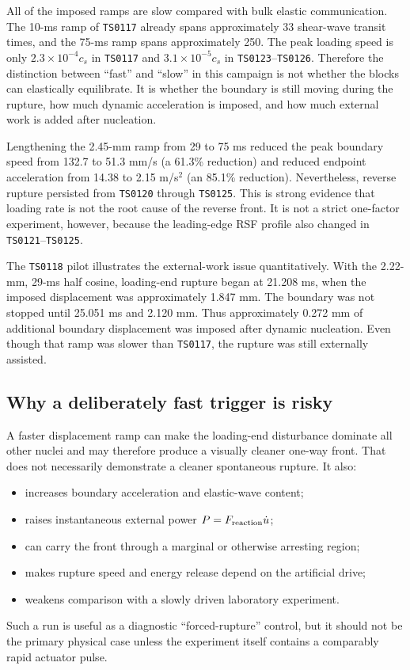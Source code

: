 \documentclass[11pt]{article}
\newcommand{\run}[1]{\texttt{TS#1}}
\begin{document}
All of the imposed ramps are slow compared with bulk elastic communication.
The 10-ms ramp of \run{0117} already spans approximately 33 shear-wave transit
times, and the 75-ms ramp spans approximately 250.  The peak loading speed is
only $2.3\times10^{-4}c_s$ in \run{0117} and
$3.1\times10^{-5}c_s$ in \run{0123}--\run{0126}.  Therefore the distinction
between ``fast'' and ``slow'' in this campaign is not whether the blocks can
elastically equilibrate.  It is whether the boundary is still moving during
the rupture, how much dynamic acceleration is imposed, and how much external
work is added after nucleation.

Lengthening the 2.45-mm ramp from 29 to 75 ms reduced the peak boundary speed
from 132.7 to 51.3 mm/s (a 61.3\% reduction) and reduced endpoint acceleration
from 14.38 to 2.15 m/s$^2$ (an 85.1\% reduction).  Nevertheless, reverse
rupture persisted from \run{0120} through \run{0125}.  This is strong evidence
that loading rate is not the root cause of the reverse front.  It is not a
strict one-factor experiment, however, because the leading-edge RSF profile
also changed in \run{0121}--\run{0125}.

The \run{0118} pilot illustrates the external-work issue quantitatively.  With
the 2.22-mm, 29-ms half cosine, loading-end rupture began at 21.208 ms, when
the imposed displacement was approximately 1.847 mm.  The boundary was not
stopped until 25.051 ms and 2.120 mm.  Thus approximately 0.272 mm of additional
boundary displacement was imposed after dynamic nucleation.  Even though that
ramp was slower than \run{0117}, the rupture was still externally assisted.

\subsection{Why a deliberately fast trigger is risky}

A faster displacement ramp can make the loading-end disturbance dominate all
other nuclei and may therefore produce a visually cleaner one-way front.  That
does not necessarily demonstrate a cleaner spontaneous rupture.  It also:
\begin{itemize}
  \item increases boundary acceleration and elastic-wave content;
  \item raises instantaneous external power $P=F_{\rm reaction}\dot{u}$;
  \item can carry the front through a marginal or otherwise arresting region;
  \item makes rupture speed and energy release depend on the artificial drive;
  \item weakens comparison with a slowly driven laboratory experiment.
\end{itemize}
Such a run is useful as a diagnostic ``forced-rupture'' control, but it should
not be the primary physical case unless the experiment itself contains a
comparably rapid actuator pulse.
\end{document}
